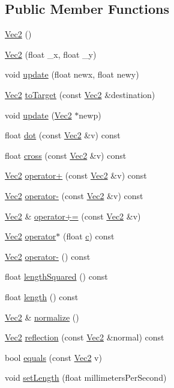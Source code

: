 \subsection*{Public Member Functions}
\begin{DoxyCompactItemize}
\item 
\hyperlink{class_vec2_a76080feed7005893ecc634f903cfbae0}{Vec2} ()
\item 
\hyperlink{class_vec2_ab4b119971b830689f9a562d5183dce92}{Vec2} (float \+\_\+x, float \+\_\+y)
\item 
void \hyperlink{class_vec2_a5f0514a17c52784e5f6d5b10911ee996}{update} (float newx, float newy)
\item 
\hyperlink{class_vec2}{Vec2} \hyperlink{class_vec2_af5391376cde50cef728ad4318c29dad7}{to\+Target} (const \hyperlink{class_vec2}{Vec2} \&destination)
\item 
void \hyperlink{class_vec2_a8464794a7667794393aa347a5ba505cc}{update} (\hyperlink{class_vec2}{Vec2} $\ast$newp)
\item 
float \hyperlink{class_vec2_aafb32f618ad13d0d98e6921f2aef53a3}{dot} (const \hyperlink{class_vec2}{Vec2} \&v) const 
\item 
float \hyperlink{class_vec2_a1aedad72c952aaef4a56844719ee2449}{cross} (const \hyperlink{class_vec2}{Vec2} \&v) const 
\item 
\hyperlink{class_vec2}{Vec2} \hyperlink{class_vec2_a55982187727e6fef357273be8e269526}{operator+} (const \hyperlink{class_vec2}{Vec2} \&v) const 
\item 
\hyperlink{class_vec2}{Vec2} \hyperlink{class_vec2_adfaf0492c67e51fc89e3f7f484519de7}{operator-\/} (const \hyperlink{class_vec2}{Vec2} \&v) const 
\item 
\hyperlink{class_vec2}{Vec2} \& \hyperlink{class_vec2_a7f062667506f94bc207bdf492ca5b89c}{operator+=} (const \hyperlink{class_vec2}{Vec2} \&v)
\item 
\hyperlink{class_vec2}{Vec2} \hyperlink{class_vec2_a41b7293b6a348ee4d33b8fa396db9adb}{operator$\ast$} (float \hyperlink{jquery_8js_abce695e0af988ece0826d9ad59b8160d}{c}) const 
\item 
\hyperlink{class_vec2}{Vec2} \hyperlink{class_vec2_a39640496ed941cf3d7e8cc7ee96eea36}{operator-\/} () const 
\item 
float \hyperlink{class_vec2_a65a6009cc22511950a84e6cadf07ae27}{length\+Squared} () const 
\item 
float \hyperlink{class_vec2_a83adaf3f787cfb5de4576073898b93db}{length} () const 
\item 
\hyperlink{class_vec2}{Vec2} \& \hyperlink{class_vec2_a3bd229e267428daddca2645a7679bb8e}{normalize} ()
\item 
\hyperlink{class_vec2}{Vec2} \hyperlink{class_vec2_accb52253548abc22b6cadc167cd883b0}{reflection} (const \hyperlink{class_vec2}{Vec2} \&normal) const 
\item 
bool \hyperlink{class_vec2_a94ced62f7c39fc9ae2989008146d7a78}{equals} (const \hyperlink{class_vec2}{Vec2} v)
\item 
void \hyperlink{class_vec2_a2ed56672ba73c4eef930c71526517cfe}{set\+Length} (float millimeters\+Per\+Second)
\end{DoxyCompactItemize}

